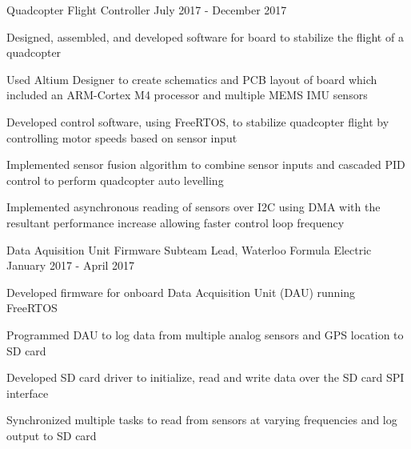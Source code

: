

\begin{cventries}

  \cventry
    {Quadcopter Flight Controller} %
    {} %
    {} %
    {July 2017 - December 2017} %
    {
      \begin{cvitems} %
        \item {Designed, assembled, and developed software for board to stabilize the flight of a quadcopter}
        \item {Used Altium Designer to create schematics and PCB layout of board which included an ARM-Cortex M4 processor and multiple MEMS IMU sensors}
        \item {Developed control software, using FreeRTOS, to stabilize quadcopter flight by controlling motor speeds based on sensor input}
        \item {Implemented sensor fusion algorithm to combine sensor inputs and cascaded PID control to perform quadcopter auto levelling}
        \item {Implemented asynchronous reading of sensors over I2C using DMA with the resultant performance increase allowing faster control loop frequency}
      \end{cvitems}
    }

  \cventrytwo
    {Data Aquisition Unit} %
    {Firmware Subteam Lead, Waterloo Formula Electric} %
    {} %
    {January 2017 - April 2017} %
    {
      \begin{cvitems} %
        \item {Developed firmware for onboard Data Acquisition Unit (DAU) running FreeRTOS}
        \item {Programmed DAU to log data from multiple analog sensors and GPS location to SD card}
        \item {Developed SD card driver to initialize, read and write data over the SD card SPI interface}
        \item {Synchronized multiple tasks to read from sensors at varying frequencies and log output to SD card}
      \end{cvitems}
    }


\end{cventries}
